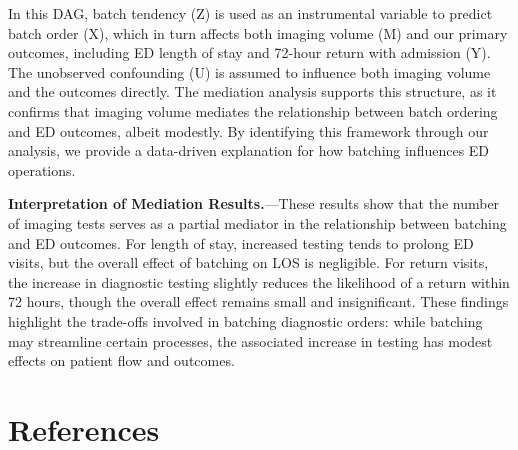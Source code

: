 \documentclass{article}
\begin{document}
In this DAG, batch tendency (Z) is used as an instrumental variable to
predict batch order (X), which in turn affects both imaging volume (M)
and our primary outcomes, including ED length of stay and 72-hour return
with admission (Y). The unobserved confounding (U) is assumed to
influence both imaging volume and the outcomes directly. The mediation
analysis supports this structure, as it confirms that imaging volume
mediates the relationship between batch ordering and ED outcomes, albeit
modestly. By identifying this framework through our analysis, we provide
a data-driven explanation for how batching influences ED operations.

\textbf{Interpretation of Mediation Results.}---These results show that
the number of imaging tests serves as a partial mediator in the
relationship between batching and ED outcomes. For length of stay,
increased testing tends to prolong ED visits, but the overall effect of
batching on LOS is negligible. For return visits, the increase in
diagnostic testing slightly reduces the likelihood of a return within 72
hours, though the overall effect remains small and insignificant. These
findings highlight the trade-offs involved in batching diagnostic
orders: while batching may streamline certain processes, the associated
increase in testing has modest effects on patient flow and outcomes.

\newpage

\hypertarget{references}{%
\section*{References}\label{references}}
\end{document}
